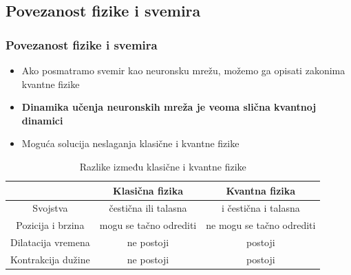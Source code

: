 \documentclass{beamer}
\begin{document}
\subsection{Povezanost fizike i svemira}
\begin{frame}[fragile]\frametitle{Povezanost fizike i svemira}
\begin{itemize}	
        \item Ako posmatramo svemir kao neuronsku mrežu, možemo ga opisati zakonima kvantne fizike
        \item \textbf{Dinamika učenja neuronskih mreža je veoma slična kvantnoj dinamici}
        \item Moguća solucija neslaganja klasične i kvantne fizike
      \end{itemize} 

\begin{table}[h!]
\begin{center}
{\footnotesize
\begin{tabular}{|c|c|c|} \hline
 & Klasična fizika& Kvantna fizika\\ \hline
Svojstva& čestična ili talasna & i čestična i talasna\\ \hline
Pozicija i brzina& mogu se tačno odrediti& ne mogu se  tačno odrediti\\ \hline 
Dilatacija vremena& ne postoji & postoji \\ \hline
Kontrakcija dužine& ne postoji& postoji\\ \hline
\end{tabular}
\caption{Razlike između klasične i kvantne fizike}
\label{tab:tabela1}
}
\end{center}
\end{table}

 
\end{frame}
\end{document}
